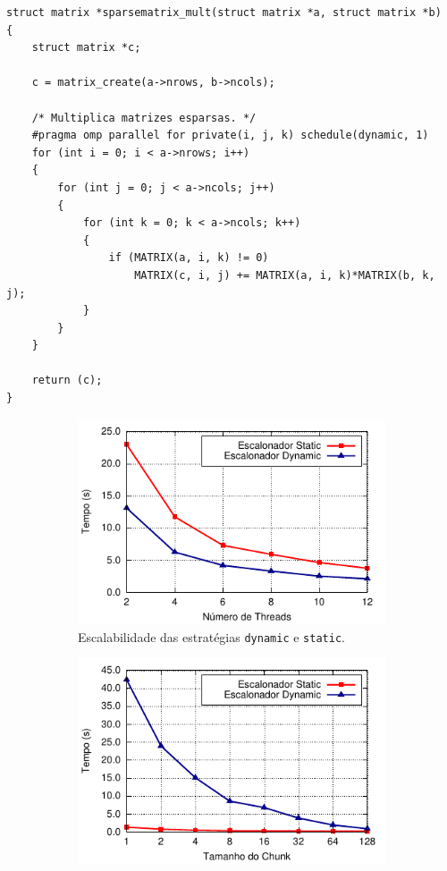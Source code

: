 \documentclass{SBCbookchapter}
\begin{document}
\begin{lstlisting}[frame=single, caption=Exemplo de multiplicação de matrizes esparsas.,
label=listing:sparsematrixmult]
struct matrix *sparsematrix_mult(struct matrix *a, struct matrix *b)
{
	struct matrix *c;

	c = matrix_create(a->nrows, b->ncols);

	/* Multiplica matrizes esparsas. */
	#pragma omp parallel for private(i, j, k) schedule(dynamic, 1)
	for (int i = 0; i < a->nrows; i++)
	{
		for (int j = 0; j < a->ncols; j++)
		{
			for (int k = 0; k < a->ncols; k++)
			{
				if (MATRIX(a, i, k) != 0)
					MATRIX(c, i, j) += MATRIX(a, i, k)*MATRIX(b, k, j);
			}
		}
	}

	return (c);
}
\end{lstlisting}

		\begin{figure}[t]
			\captionsetup[subfigure]{justification=centering}
			\centering
				\begin{subfigure}{0.45\linewidth}
					\includegraphics[width=\linewidth]{img/smm}
					\caption{Escalabilidade das estratégias \texttt{dynamic} e \texttt{static}.}
					\label{fig:static-dynamic-guided}
				\end{subfigure}
				\quad
				\begin{subfigure}{0.45\linewidth}
					\includegraphics[width=\linewidth]{img/chunk-size}

\end{subfigure}
\end{figure}
\end{document}
